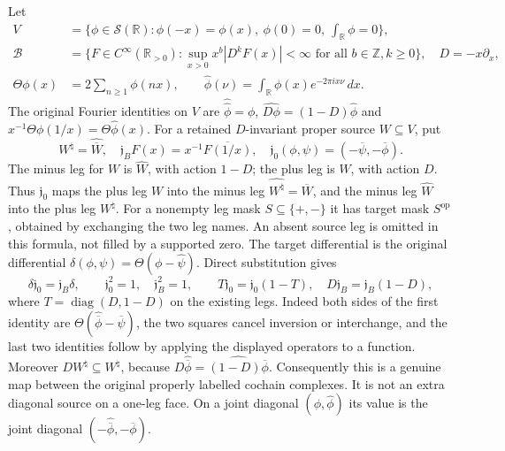 Let
\[
\begin{split}
 V&=\{\phi\in\mathcal S(\mathbb R):\phi(-x)=\phi(x),\
                  \phi(0)=0,\ \int_{\mathbb R}\phi=0\},\\
 \mathscr B&=\{F\in C^\infty(\mathbb R_{>0}):
        \sup_{x>0}x^b|D^kF(x)|<\infty
        \text{ for all }b\in\mathbb Z,k\geq0\},\quad D=-x\partial_x,\\
 \Theta\phi(x)&=2\sum_{n\geq1}\phi(nx),\qquad
 \widehat\phi(\nu)=\int_{\mathbb R}\phi(x)e^{-2\pi ix\nu}\,dx.
\end{split}
 \tag{SBD3}
\]
The original Fourier identities on $V$ are
$\widehat{\widehat\phi}=\phi$,
$\widehat{D\phi}=(1-D)\widehat\phi$ and
$x^{-1}\Theta\phi(1/x)=\Theta\widehat\phi(x)$.
For a retained $D$-invariant proper source $W\subseteq V$, put
\[
 W^\natural=\widehat{\overline W},\quad
 \mathfrak j_BF(x)=x^{-1}\overline{F(1/x)},\quad
 \mathfrak j_0(\phi,\psi)=(-\overline\psi,-\overline\phi).
 \tag{SBD4}
\]
The minus leg for $W$ is $\widehat W$, with action $1-D$;
the plus leg is $W$, with action $D$. Thus
$\mathfrak j_0$ maps the plus leg $W$ into the minus leg
$\widehat{W^\natural}=\overline W$, and the minus leg
$\widehat W$ into the plus leg $W^\natural$.
For a nonempty leg mask $S\subseteq\{+,-\}$ it has target mask
$S^{\mathrm{op}}$, obtained by exchanging the two leg names.
An absent source leg is omitted in this formula, not filled by a
supported zero. The target differential is the original differential
$\delta(\phi,\psi)=\Theta(\phi-\widehat\psi)$.
Direct substitution gives
\[
 \delta\mathfrak j_0=\mathfrak j_B\delta,\qquad
 \mathfrak j_0^2=1,\quad\mathfrak j_B^2=1,\qquad
 T\mathfrak j_0=\mathfrak j_0(1-T),\quad
 D\mathfrak j_B=\mathfrak j_B(1-D),
 \tag{SBD5}
\]
where $T=\operatorname{diag}(D,1-D)$ on the existing legs.
Indeed both sides of the first identity are
$\Theta(\widehat{\overline\phi}-\overline\psi)$, the
two squares cancel inversion or interchange, and the last two
identities follow by applying the displayed operators to a function.
Moreover $D W^\natural\subseteq W^\natural$, because
$D\widehat{\overline\phi}=\widehat{(1-D)\overline\phi}$.
Consequently this is a genuine map between the original properly
labelled cochain complexes. It is not an extra diagonal source on a
one-leg face. On a joint diagonal $(\phi,\widehat\phi)$ its
value is the joint diagonal
$(-\widehat{\overline\phi},-\overline\phi)$.

